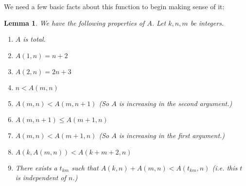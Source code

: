 \documentclass{article}
\theoremstyle{definition}
\theoremstyle{plain}
\theoremstyle{theorem}
\newtheorem{lemma}{Lemma}[section]
\begin{document}
\par We need a few basic facts about this function to begin making sense of it:
\begin{lemma}
    We have the following properties of $A$. Let $k,n,m$ be integers.
    \begin{enumerate}
        \item $A$ is total. 
        \item $A(1,n) = n+2$
        \item $A(2,n) = 2n+3$
        \item $n < A(m,n)$
        \item $A(m,n) < A(m,n+1)$ (So $A$ is increasing in the second argument.)
        \item $A(m,n+1) \leq A(m+1,n)$
        \item $A(m,n) < A(m+1,n)$ (So $A$ is increasing in the first argument.)
        \item $A(k,A(m,n)) < A(k+m+2,n)$
        \item There exists a $t_{km}$ such that $A(k,n)+A(m,n)<A(t_{km},n)$ (i.e. this $t$ is independent of $n$.)
    \end{enumerate}
\end{lemma}
\end{document}

